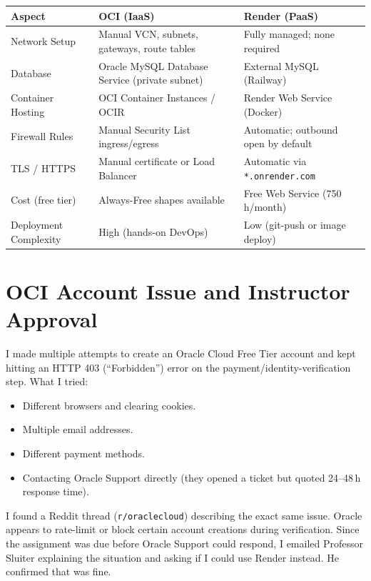 \documentclass[11pt,letterpaper]{article}
\begin{document}
\begin{center}
\begin{tabularx}{\textwidth}{lXX}
\toprule
\textbf{Aspect} & \textbf{OCI (IaaS)} & \textbf{Render (PaaS)} \\
\midrule
Network Setup         & Manual VCN, subnets, gateways, route tables & Fully managed; none required \\
Database              & Oracle MySQL Database Service (private subnet) & External MySQL (Railway) \\
Container Hosting     & OCI Container Instances / OCIR                 & Render Web Service (Docker) \\
Firewall Rules        & Manual Security List ingress/egress             & Automatic; outbound open by default \\
TLS / HTTPS           & Manual certificate or Load Balancer             & Automatic via \texttt{*.onrender.com} \\
Cost (free tier)      & Always-Free shapes available                    & Free Web Service (750\,h/month) \\
Deployment Complexity & High (hands-on DevOps)                          & Low (git-push or image deploy) \\
\bottomrule
\end{tabularx}
\end{center}

\section{OCI Account Issue and Instructor Approval}

I made multiple attempts to create an Oracle Cloud Free Tier account and kept hitting an HTTP 403 (``Forbidden'') error on the payment/identity-verification step. What I tried:

\begin{itemize}[nosep]
  \item Different browsers and clearing cookies.
  \item Multiple email addresses.
  \item Different payment methods.
  \item Contacting Oracle Support directly (they opened a ticket but quoted 24--48\,h response time).
\end{itemize}

I found a Reddit thread (\texttt{r/oraclecloud}) describing the exact same issue. Oracle appears to rate-limit or block certain account creations during verification. Since the assignment was due before Oracle Support could respond, I emailed Professor Sluiter explaining the situation and asking if I could use Render instead. He confirmed that was fine.
\end{document}
